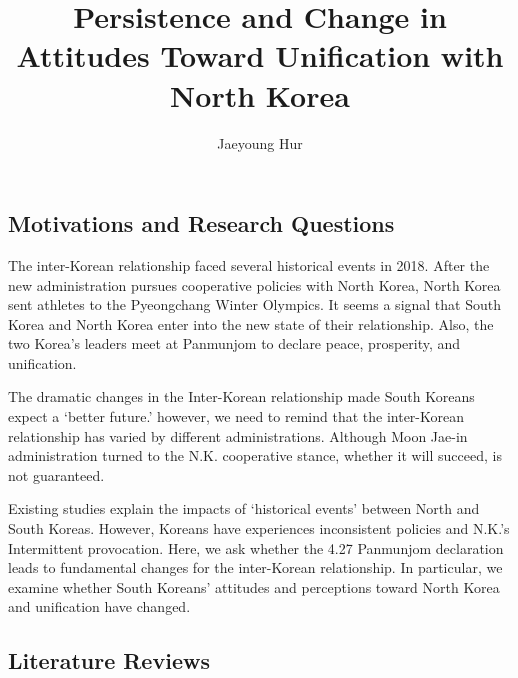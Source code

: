 \documentclass[letterpaper,10pt,twocolumn,twoside,]{pinp}
\title{Persistence and Change in Attitudes Toward Unification with North
Korea}
\author[a]{Jaeyoung Hur}
\affil[a]{Global leaders College, Yonsei University, Seoul, ROK}
\begin{document}
\verticaladjustment{-2pt}

\maketitle
\thispagestyle{firststyle}



\hypertarget{motivations-and-research-questions}{%
\subsection{Motivations and Research
Questions}\label{motivations-and-research-questions}}

The inter-Korean relationship faced several historical events in 2018.
After the new administration pursues cooperative policies with North
Korea, North Korea sent athletes to the Pyeongchang Winter Olympics. It
seems a signal that South Korea and North Korea enter into the new state
of their relationship. Also, the two Korea's leaders meet at Panmunjom
to declare peace, prosperity, and unification.

The dramatic changes in the Inter-Korean relationship made South Koreans
expect a `better future.' however, we need to remind that the
inter-Korean relationship has varied by different administrations.
Although Moon Jae-in administration turned to the N.K. cooperative
stance, whether it will succeed, is not guaranteed.

Existing studies explain the impacts of `historical events' between
North and South Koreas. However, Koreans have experiences inconsistent
policies and N.K.'s Intermittent provocation. Here, we ask whether the
4.27 Panmunjom declaration leads to fundamental changes for the
inter-Korean relationship. In particular, we examine whether South
Koreans' attitudes and perceptions toward North Korea and unification
have changed.

\hypertarget{literature-reviews}{%
\subsection{Literature Reviews}\label{literature-reviews}}
\end{document}
